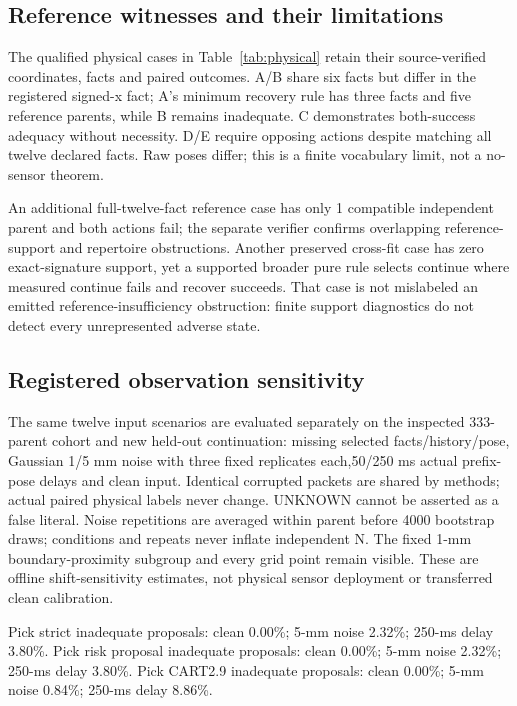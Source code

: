 \documentclass[conference]{IEEEtran}
\begin{document}
\subsection{Reference witnesses and their limitations}
The qualified physical cases in Table~\ref{tab:physical} retain their source-verified coordinates, facts and paired outcomes. A/B share six facts but differ in the registered signed-x fact; A's minimum recovery rule has three facts and five reference parents, while B remains inadequate. C demonstrates both-success adequacy without necessity. D/E require opposing actions despite matching all twelve declared facts. Raw poses differ; this is a finite vocabulary limit, not a no-sensor theorem.

An additional full-twelve-fact reference case has only 1 compatible independent parent and both actions fail; the separate verifier confirms overlapping reference-support and repertoire obstructions. Another preserved cross-fit case has zero exact-signature support, yet a supported broader pure rule selects continue where measured continue fails and recover succeeds. That case is not mislabeled an emitted reference-insufficiency obstruction: finite support diagnostics do not detect every unrepresented adverse state.

\subsection{Registered observation sensitivity}
The same twelve input scenarios are evaluated separately on the inspected 333-parent cohort and new held-out continuation: missing selected facts/history/pose, Gaussian 1/5 mm noise with three fixed replicates each,50/250 ms actual prefix-pose delays and clean input. Identical corrupted packets are shared by methods; actual paired physical labels never change. UNKNOWN cannot be asserted as a false literal. Noise repetitions are averaged within parent before 4000 bootstrap draws; conditions and repeats never inflate independent N. The fixed 1-mm boundary-proximity subgroup and every grid point remain visible. These are offline shift-sensitivity estimates, not physical sensor deployment or transferred clean calibration.

Pick strict inadequate proposals: clean 0.00\%; 5-mm noise 2.32\%; 250-ms delay 3.80\%. Pick risk proposal inadequate proposals: clean 0.00\%; 5-mm noise 2.32\%; 250-ms delay 3.80\%. Pick CART2.9 inadequate proposals: clean 0.00\%; 5-mm noise 0.84\%; 250-ms delay 8.86\%.
\end{document}
